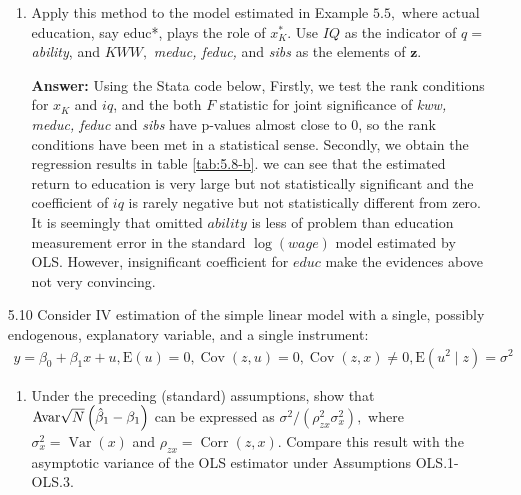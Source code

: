 \documentclass[UTF8]{article} %
\begin{document}
\begin{enumerate}
\begin{enumerate}
        \item Apply this method to the model estimated in Example $5.5,$ where actual education, say educ*, plays the role of $x_{K}^{*}$. Use $I Q$ as the indicator of $q=$ \textit{ability}, and $K W W,$ \textit{meduc, feduc,} and \textit{sibs} as the elements of $\mathbf{z}$.
        
        \textbf{Answer:} Using the Stata code below, Firstly, we test the rank conditions for $x_K$ and $iq$, and the both $F$ statistic for joint significance of \textit{kww, meduc, feduc} and \textit{sibs} have p-values almost close to 0, so the rank conditions have been met in a statistical sense. Secondly, we obtain the regression results in table \ref{tab:5.8-b}. we can see that the estimated return to education is very large but not statistically significant and the coefficient of $iq$ is rarely negative but not statistically different from zero. It is seemingly that omitted $ability$ is less of problem than education measurement error in the standard $\log(wage)$ model estimated by OLS. However, insignificant coefficient for $educ$ make the evidences above not very convincing.
        
        
    \end{enumerate}
    
    
    \item[5.10] Consider IV estimation of the simple linear model with a single, possibly endogenous, explanatory variable, and a single instrument:
    \begin{gather*}
        y=\beta_{0}+\beta_{1} x+u, \mathrm{E}(u)=0,  \operatorname{Cov}(z, u)=0,  \operatorname{Cov}(z, x) \neq 0,  \mathrm{E}\left(u^{2} \mid z\right)=\sigma^{2}
    \end{gather*}
    \begin{enumerate}
        \item Under the preceding (standard) assumptions, show that $\mathrm{Avar}\sqrt{N}\left(\hat{\beta}_{1}-\beta_{1}\right)$ can be expressed as $\sigma^{2} /\left(\rho_{z x}^{2} \sigma_{x}^{2}\right),$ where $\sigma_{x}^{2}=\operatorname{Var}(x)$ and $\rho_{z x}=\operatorname{Corr}(z, x) .$ Compare this result with the asymptotic variance of the OLS estimator under Assumptions OLS.1-OLS.3.
        

\end{enumerate}
\end{enumerate}
\end{document}
